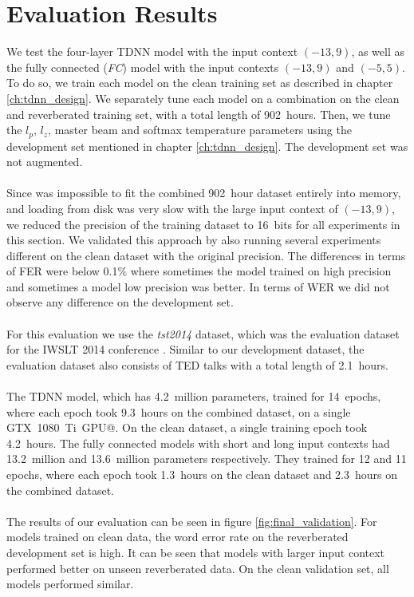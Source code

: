 \section{Evaluation Results}
We test the four-layer TDNN model with the input context $(-13, 9)$, as well as the fully connected (\textit{FC}) model with the input contexts $(-13, 9)$ and $(-5, 5)$. To do so, we train each model on the clean training set as described in chapter \ref{ch:tdnn_design}. We separately tune each model on a combination on the clean and reverberated training set, with a total length of 902~hours. Then, we tune the $l_p$, $l_z$, master beam and softmax temperature parameters using the development set mentioned in chapter \ref{ch:tdnn_design}. The development set was not augmented. \\ \\ Since was impossible to fit the combined 902~hour dataset entirely into memory, and loading from disk was very slow with the large input context of $(-13, 9)$, we reduced the precision of the training dataset to 16~bits for all experiments in this section. We validated this approach by also running several experiments different on the clean dataset with the original precision. The differences in terms of FER were below 0.1\% where sometimes the model trained on high precision and sometimes a model low precision was better. In terms of WER we did not observe any difference on the development set. \\ \\
For this evaluation we use the \textit{tst2014} dataset, which was the evaluation dataset for the IWSLT 2014 conference \cite{cettolo2014report}. Similar to our development dataset, the evaluation dataset also consists of TED talks with a total length of 2.1~hours. \\ \\
The TDNN model, which has 4.2~million parameters, trained for 14~epochs, where each epoch took 9.3~hours on the combined dataset, on a single GTX~1080~Ti~GPU@. On the clean dataset, a single training epoch took 4.2~hours. The fully connected models with short and long input contexts had 13.2~million and 13.6~million parameters respectively. They trained for 12 and 11 epochs, where each epoch took 1.3~hours on the clean dataset and 2.3~hours on the combined dataset. 
\\ \\
The results of our evaluation can be seen in figure \ref{fig:final_validation}. For models trained on clean data, the word error rate on the reverberated development set is high. It can be seen that models with larger input context performed better on unseen reverberated data. On the clean validation set, all models performed similar. \\ \\
